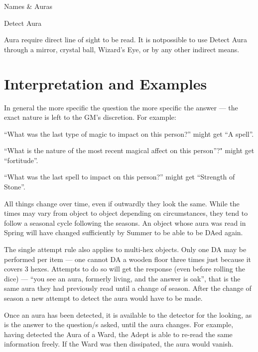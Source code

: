 \begin{Chapter}{Names \& Auras}
\begin{talent}{Detect Aura}
\begin{effects}
Aura require direct line of sight to be read. It is notpossible to use
Detect Aura through a mirror, crystal ball, Wizard’s Eye, or by any
other indirect means.
\end{effects}
\end{talent}

\section{Interpretation and Examples}

\begin{Enumerate}
\item In general the more specific the question the more specific the
  answer — the exact nature is left to the GM’s discretion. For
  example:
  \begin{Itemize}
  \item “What was the last type of magic to impact on this person?”
    might get “A spell”.

  \item “What is the nature of the most recent magical affect on this
    person”?" might get “fortitude”.

  \item “What was the last spell to impact on this person?” might
    get “Strength of Stone”.
  \end{Itemize}

\item All things change over time, even if outwardly they look the
  same. While the times may vary from object to object depending on
  circumstances, they tend to follow a seasonal cycle following the
  seasons.  An object whose aura was read in Spring will have changed
  sufficiently by Summer to be able to be DAed again.

\item The single attempt rule also applies to multi-hex objects.  Only
  one DA may be performed per item — one cannot DA a wooden floor
  three times just because it covers 3 hexes.  Attempts to do so will
  get the response (even before rolling the dice) — “you see an aura,
  formerly living, and the answer is oak”, that is the same aura they
  had previously read until a change of season.  After the change of
  season a new attempt to detect the aura would have to be made.

\item Once an aura has been detected, it is available to the detector
  for the looking, as is the answer to the question/s asked, until the
  aura changes. For example, having detected the Aura of a Ward, the
  Adept is able to re-read the same information freely. If the Ward
  was then dissipated, the aura would vanish.


\end{Enumerate}
\end{Chapter}
